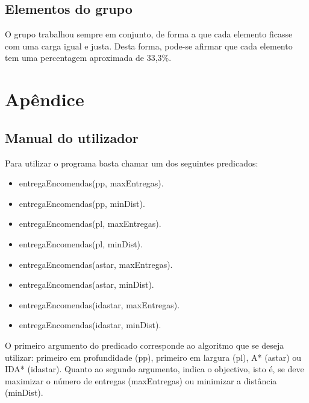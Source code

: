 \documentclass[a4paper]{article}
\begin{document}
\subsection{Elementos do grupo}
O grupo trabalhou sempre em conjunto, de forma a que cada elemento ficasse com uma carga igual e justa. Desta forma, pode-se afirmar que cada elemento tem uma percentagem aproximada de 33,3\%.

\newpage
\appendix
\section{Apêndice}
\subsection{Manual do utilizador}

Para utilizar o programa basta chamar um dos seguintes predicados:
\begin{itemize}
	\item entregaEncomendas(pp, maxEntregas).
	\item entregaEncomendas(pp, minDist).
	\item entregaEncomendas(pl, maxEntregas).
	\item entregaEncomendas(pl, minDist).
	\item entregaEncomendas(astar, maxEntregas).
	\item entregaEncomendas(astar, minDist).
	\item entregaEncomendas(idastar, maxEntregas).
	\item entregaEncomendas(idastar, minDist).
\end{itemize}

O primeiro argumento do predicado corresponde ao algoritmo que se deseja utilizar: primeiro em profundidade (pp), primeiro em largura (pl), A* (astar) ou IDA* (idastar). Quanto ao segundo argumento, indica o objectivo, isto é, se deve maximizar o número de entregas (maxEntregas) ou minimizar a distância (minDist).
\end{document}

